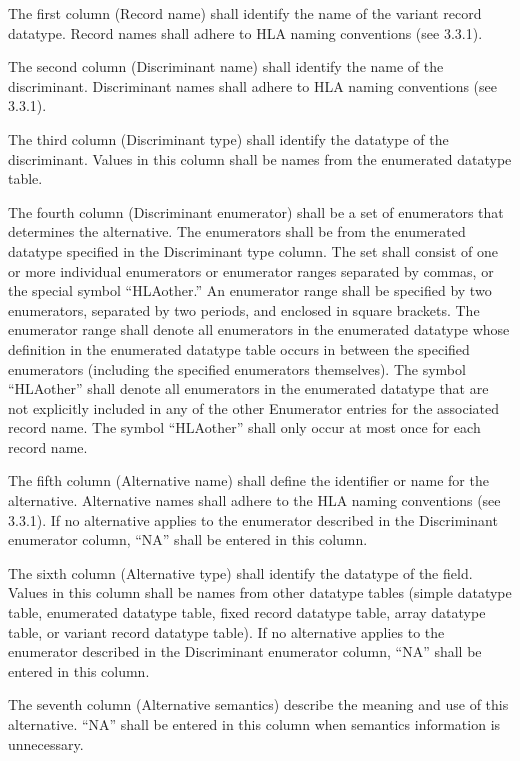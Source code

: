 \endgroup

The first column (Record name) shall identify the name of the variant record datatype. Record names shall adhere to HLA naming conventions (see 3.3.1).

The second column (Discriminant name) shall identify the name of the discriminant. Discriminant names shall adhere to HLA naming conventions (see 3.3.1).

The third column (Discriminant type) shall identify the datatype of the discriminant. Values in this column shall be names from the enumerated datatype table.

The fourth column (Discriminant enumerator) shall be a set of enumerators that determines the alternative. The enumerators shall be from the enumerated datatype specified in the Discriminant type column. The set shall consist of one or more individual enumerators or enumerator ranges separated by commas, or the special symbol ``HLAother.'' An enumerator range shall be specified by two enumerators, separated by two periods, and enclosed in square brackets. The enumerator range shall denote all enumerators in the enumerated datatype whose definition in the enumerated datatype table occurs in between the specified enumerators (including the specified enumerators themselves). The symbol ``HLAother'' shall denote all enumerators in the enumerated datatype that are not explicitly included in any of the other Enumerator entries for the associated record name. The symbol ``HLAother'' shall only occur at most once for each record name.

The fifth column (Alternative name) shall define the identifier or name for the alternative. Alternative names shall adhere to the HLA naming conventions (see 3.3.1). If no alternative applies to the enumerator described in the Discriminant enumerator column, ``NA'' shall be entered in this column.

The sixth column (Alternative type) shall identify the datatype of the field. Values in this column shall be names from other datatype tables (simple datatype table, enumerated datatype table, fixed record datatype table, array datatype table, or variant record datatype table). If no alternative applies to the enumerator described in the Discriminant enumerator column, ``NA'' shall be entered in this column.

The seventh column (Alternative semantics) describe the meaning and use of this alternative. ``NA'' shall be entered in this column when semantics information is unnecessary.

